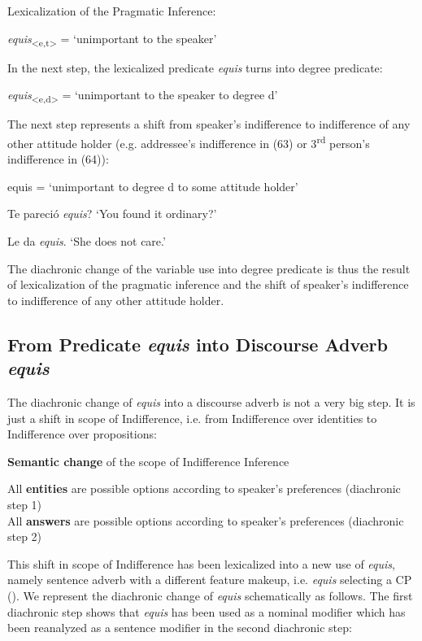 \documentclass[output=paper
,modfonts
,nonflat]{langsci/langscibook}
\begin{document}
\ea Lexicalization of the Pragmatic Inference:\par
	\textit{equis}\textsubscript{<e,t>} = ‘unimportant to the speaker’ 
\z

In the next step, the lexicalized predicate \textit{equis} turns into degree predicate:

\ea \textit{equis}\textsubscript{<e,d>} = ‘unimportant to the speaker to degree d’
\z

The next step represents a shift from speaker’s indifference to  indifference of any other attitude holder (e.g. addressee’s indifference in (63) or 3\textsuperscript{rd} person’s indifference in (64)):

\ea	equis = ‘unimportant to degree d to some attitude holder’ 
\z

\ea Te pareció \textit{equis}? ‘You found it ordinary?’
\z

\ea Le da \textit{equis}. ‘She does not care.’
\z

The diachronic change of the variable use into degree predicate is thus the result of lexicalization of the pragmatic inference and the shift of speaker’s indifference to indifference of any other attitude holder.


\subsection{From Predicate \textit{equis} into Discourse Adverb \textit{equis}}\label{sec:kellert:4.2}
The diachronic change of \textit{equis} into a discourse adverb is not a very big step. It is just a shift in scope of Indifference, i.e. from Indifference over identities to Indifference over propositions:

\ea \textbf{Semantic change} of the scope of Indifference Inference\\
\begin{xlist}
 All \textbf{entities} are possible options according to speaker’s preferences (diachronic step 1)\\
 All \textbf{answers} are possible options according to speaker’s preferences (diachronic step 2)
\end{xlist}
\z

This shift in scope of Indifference has been lexicalized into a new use of \textit{equis}, namely sentence adverb with a different feature makeup, i.e. \textit{equis} selecting a CP (). We represent the diachronic change of \textit{equis} schematically as follows. The first diachronic step shows that \textit{equis} has been used as a nominal modifier which has been reanalyzed as a sentence modifier in the second diachronic step:
\end{document}
